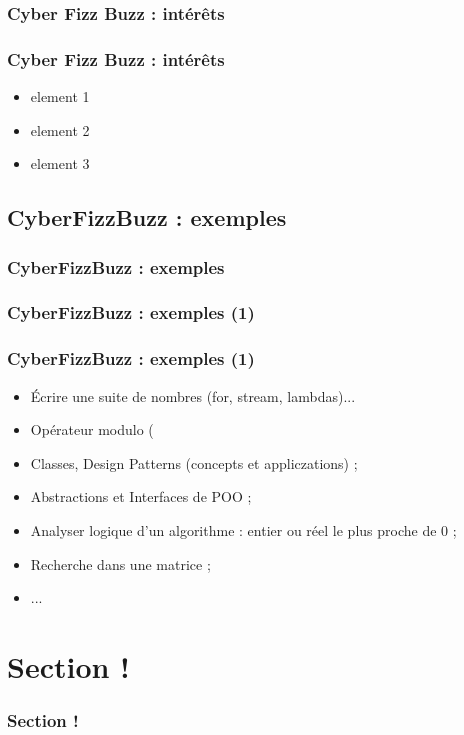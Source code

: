 \documentclass[slidetop,11pt]{beamer}
\begin{document}
\subsubsection{Cyber Fizz Buzz : int{\'e}r{\^e}ts}
\begin{frame}
	\frametitle{Cyber Fizz Buzz : int{\'e}r{\^e}ts}
	\begin{itemize}
		\item element 1
		\item element 2
		\item element 3
	\end{itemize}
\end{frame} 

\subsection{CyberFizzBuzz : exemples}
\begin{frame}
	\frametitle{CyberFizzBuzz : exemples}
	\tableofcontents[sections=1,currentsection,subsectionstyle=show/shaded/hide]
\end{frame} 

\subsubsection{CyberFizzBuzz : exemples (1)}
\begin{frame}
	\frametitle{CyberFizzBuzz : exemples (1)}
	\begin{itemize}
		\item {\'E}crire une suite de nombres (for, stream, lambdas)...
		\item Op{\'e}rateur modulo (%
		\item Classes, Design Patterns (concepts et appliczations) ; 
		\item Abstractions et Interfaces de POO ; 
		\item Analyser logique d'un algorithme : entier ou r{\'e}el le plus proche de 0 ; 
		\item Recherche dans une matrice ; 
		\item ... 
	\end{itemize}
\end{frame} 

\section{Section !}
\begin{frame}
	\frametitle{Section !}
	\tableofcontents[sections=2,currentsection,subsectionstyle=show/shaded/hide] %
\end{frame} 
\end{document}
